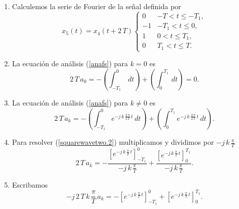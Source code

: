 \begin{enumerate}
	\item  Calculemos la serie de Fourier de la se\~{n}al definida por
	\begin{equation}
		x_{5}\left( t\right) = x_{4}(t+2 \, T)\left\{ 
		\begin{array}{cc}
			0   & -T < t \leq -T_{1}, \\
			-1  & -T_{1} < t \leq 0, \\ 
			1   & 0 < t \leq T_{1}, \\
			0  & T_{1} < t \leq T.
		\end{array}
		\right. \label{squarewavetwo.1}
	\end{equation}
	\item La ecuación de análisis (\ref{anafs}) para $k = 0$ es
    \begin{equation}
	2 \, T \, a_{0} = 
	-\left(\int_{-T_{1}}^{0}  \, dt\right)
	+\left(\int_{0}^{T_{1}}  \, dt\right)	= 0.
    \end{equation}

	\item La ecuación de análisis (\ref{anafs}) para $k \neq 0$ es
	\begin{equation}
		2 \, T \, a_{k} = 
		-\left(\int_{-T_{1}}^{0} e^{-j \, k \,\frac{2 \, \pi }{2 \, T} \, t} \, dt\right)
		+\left(\int_{0}^{T_{1}} e^{-j \, k \,\frac{2 \, \pi }{2 \, T} \, t} \, dt\right).
		\label{squarewavetwo.2}
	\end{equation}

	\item Para resolver (\ref{squarewavetwo.2}) multiplicamos y dividimos por $-j \, k \, \frac{\pi}{T}$
\begin{equation}
	2 \, T \, a_{k} = 
	-\frac{\left[e^{-j \, k \,\frac{\pi }{T} \, t} \right]_{-T_{1}}^{0}}{-j \, k \, \frac{\pi}{T}} 
	+\frac{\left[e^{-j \, k \,\frac{\pi }{T} \, t} \right]_{0}^{T_{1}}}{-j \, k \, \frac{\pi}{T}}.
	\label{squarewavetwo.3}
\end{equation}

	\item Escribamos
\begin{equation}
	-j \, 2 \, T \, k \, \frac{\pi}{T} \, a_{k} = 
	-\left[e^{-j \, k \,\frac{\pi }{T} \, t} \right]_{-T_{1}}^{0} 
	+\left[e^{-j \, k \,\frac{\pi }{T} \, t} \right]_{0}^{T_{1}}.
	\label{squarewavetwo.4}
\end{equation}


\end{enumerate}
